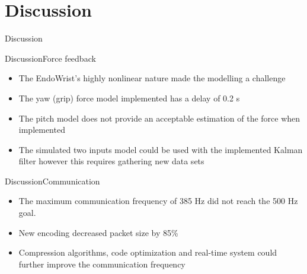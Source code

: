 \section{Discussion}

\begin{frame}{Discussion}{}	
	
\end{frame}

\begin{frame}{Discussion}{Force feedback}
	
	
	\begin{itemize}
		\item The EndoWrist's highly nonlinear nature made the modelling a challenge
		\item The yaw (grip) force model implemented has a delay of 0.2 s 
		\item The pitch model does not provide an acceptable estimation of the force when implemented
		\item The simulated two inputs model could be used with the implemented Kalman filter however this requires gathering new data sets
	\end{itemize}
	
	
\end{frame}

\begin{frame}{Discussion}{Communication}


  \begin{itemize}
  	\item The maximum communication frequency of 385 Hz did not reach the 500 Hz goal.
  	\item New encoding  decreased packet size by 85\%
  	\item Compression algorithms, code optimization and real-time system could further improve the communication frequency
   
  \end{itemize}


\end{frame}






